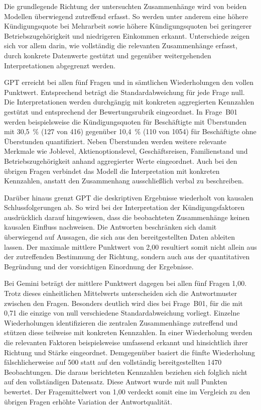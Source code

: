 Die grundlegende Richtung der untersuchten Zusammenhänge wird von beiden Modellen überwiegend zutreffend erfasst. So werden unter anderem eine höhere Kündigungsquote bei Mehrarbeit sowie höhere Kündigungsquoten bei geringerer Betriebszugehörigkeit und niedrigeren Einkommen erkannt. Unterschiede zeigen sich vor allem darin, wie vollständig die relevanten Zusammenhänge erfasst, durch konkrete Datenwerte gestützt und gegenüber weitergehenden Interpretationen abgegrenzt werden.

GPT erreicht bei allen fünf Fragen und in sämtlichen Wiederholungen den vollen Punktwert. Entsprechend beträgt die Standardabweichung für jede Frage null. Die Interpretationen werden durchgängig mit konkreten aggregierten Kennzahlen gestützt und entsprechend der Bewertungsrubrik eingeordnet. In Frage~B01 werden beispielsweise die Kündigungsquoten für Beschäftigte mit Überstunden mit 30,5~\% (127 von 416) gegenüber 10,4~\% (110 von 1054) für Beschäftigte ohne Überstunden quantifiziert. Neben Überstunden werden weitere relevante Merkmale wie Joblevel, Aktienoptionslevel, Geschäftsreisen, Familienstand und Betriebszugehörigkeit anhand aggregierter Werte eingeordnet. Auch bei den übrigen Fragen verbindet das Modell die Interpretation mit konkreten Kennzahlen, anstatt den Zusammenhang ausschließlich verbal zu beschreiben.

Darüber hinaus grenzt GPT die deskriptiven Ergebnisse wiederholt von kausalen Schlussfolgerungen ab. So wird bei der Interpretation der Kündigungsfaktoren ausdrücklich darauf hingewiesen, dass die beobachteten Zusammenhänge keinen kausalen Einfluss nachweisen. Die Antworten beschränken sich damit überwiegend auf Aussagen, die sich aus den bereitgestellten Daten ableiten lassen. Der maximale mittlere Punktwert von 2,00 resultiert somit nicht allein aus der zutreffenden Bestimmung der Richtung, sondern auch aus der quantitativen Begründung und der vorsichtigen Einordnung der Ergebnisse.

Bei Gemini beträgt der mittlere Punktwert dagegen bei allen fünf Fragen 1,00. Trotz dieses einheitlichen Mittelwerts unterscheiden sich die Antwortmuster zwischen den Fragen. Besonders deutlich wird dies bei Frage~B01, für die mit 0,71 die einzige von null verschiedene Standardabweichung vorliegt. Einzelne Wiederholungen identifizieren die zentralen Zusammenhänge zutreffend und stützen diese teilweise mit konkreten Kennzahlen. In einer Wiederholung werden die relevanten Faktoren beispielsweise umfassend erkannt und hinsichtlich ihrer Richtung und Stärke eingeordnet. Demgegenüber basiert die fünfte Wiederholung fälschlicherweise auf 500 statt auf den vollständig bereitgestellten 1470 Beobachtungen. Die daraus berichteten Kennzahlen beziehen sich folglich nicht auf den vollständigen Datensatz. Diese Antwort wurde mit null Punkten bewertet. Der Fragemittelwert von 1,00 verdeckt somit eine im Vergleich zu den übrigen Fragen erhöhte Variation der Antwortqualität.

